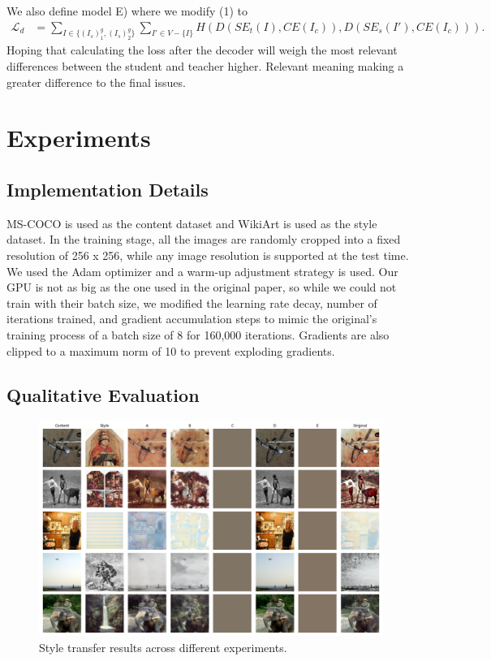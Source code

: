 \documentclass{article}
\begin{document}
We also define model E) where we modify (1) to
\begin{align}
	\mathcal L_d &= \sum_{I \in \{(I_s)^g_1, (I_s)^g_2\}} \sum_{I' \in V - \{ I \}} H(D(SE_t(I), CE(I_c)), D(SE_s(I'), CE(I_c))).
\end{align}
Hoping that calculating the loss after the decoder will weigh the most relevant differences between the student and teacher higher. Relevant meaning making a greater difference to the final issues.

\section{Experiments}

\subsection{Implementation Details}

MS-COCO \cite{COCO} is used as the content dataset and WikiArt \cite{Wikiart} is used as the style dataset. In the training stage,
all the images are randomly cropped into a fixed resolution of 256 x 256, while any image resolution is supported at the test time. We used the Adam optimizer \cite{Adam} and a warm-up adjustment strategy \cite{Warmup} is used. Our GPU is not as big as the one used in the original paper, so while we could not train with their batch size, we modified the learning rate decay, number of iterations trained, and gradient accumulation steps to mimic the original's training process of a batch size of 8 for 160,000 iterations. Gradients are also clipped to a maximum norm of 10 to prevent exploding gradients.

\subsection{Qualitative Evaluation}

\begin{center}
\begin{figure}
\includegraphics[width=14cm]{comparison}	
\caption{Style transfer results across different experiments.}
\label{comparison}
\end{figure}
\end{center}
\end{document}
